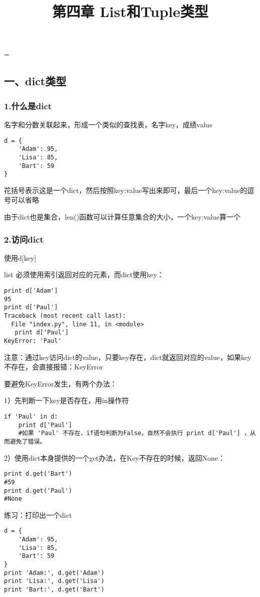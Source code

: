 \documentclass{article}
\begin{document}
 
\hfuzz=\maxdimen
{}
\begin{CJK}{UTF8}{gbsn}  
\title{第四章 List和Tuple类型}
\author{}
\date{}
\maketitle
\part*{一、dict类型}
\section*{1.什么是dict}
\subparagraph*{}
名字和分数关联起来，形成一个类似的查找表，名字key，成绩value
\begin{verbatim}
d = {
    'Adam': 95,
    'Lisa': 85,
    'Bart': 59
}
\end{verbatim}
\subparagraph*{}
花括号{}表示这是一个dict，然后按照key:value写出来即可，最后一个key:value的逗号可以省略
\subparagraph*{}
由于dict也是集合，len()函数可以计算任意集合的大小，一个key:value算一个
\section*{2.访问dict}
\subparagraph*{}
使用d[key]
\subparagraph*{}
list 必须使用索引返回对应的元素，而dict使用key：
\begin{verbatim}
print d['Adam']
95
print d['Paul']
Traceback (most recent call last):
  File "index.py", line 11, in <module>
   print d['Paul']
KeyError: 'Paul'
\end{verbatim}
\subparagraph*{}
注意：通过key访问dict的value，只要key存在，dict就返回对应的value，如果key不存在，会直接报错：KeyError
\subparagraph*{}
要避免KeyError发生，有两个办法：
\subparagraph*{}
1）先判断一下key是否存在，用in操作符
\begin{verbatim}
if 'Paul' in d:
    print d['Paul']
    #如果 'Paul' 不存在，if语句判断为False，自然不会执行 print d['Paul'] ，从而避免了错误。  
\end{verbatim}
\subparagraph*{}
2）使用dict本身提供的一个get办法，在Key不存在的时候，返回None：
\begin{verbatim}
print d.get('Bart')
#59
print d.get('Paul')
#None
\end{verbatim}
\subparagraph*{}
练习：打印出一个dict
\begin{verbatim}
d = {
    'Adam': 95,
    'Lisa': 85,
    'Bart': 59
}
print 'Adam:', d.get('Adam')
print 'Lisa:', d.get('Lisa')
print 'Bart:', d.get('Bart')
\end{verbatim}

\end{CJK}
\end{document}

